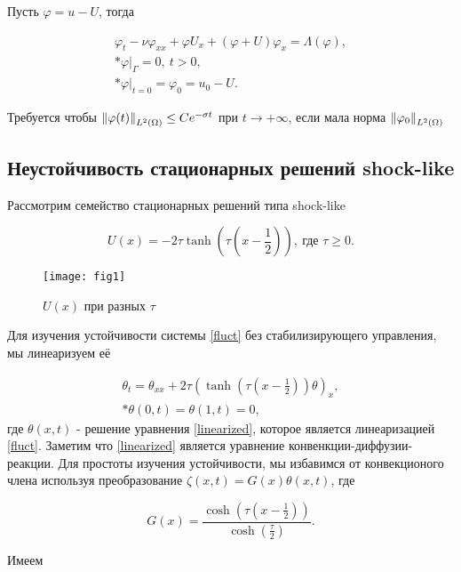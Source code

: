 Пусть $\varphi = u - U$, тогда

\begin{gather}\label{fluct}
    \varphi_t - \nu \varphi_{xx} + \varphi U_x + (\varphi + U)\varphi_x =
    \Lambda(\varphi),\\* 
    \varphi|_{\Gamma} = 0, \ t > 0,\\*
    \varphi|_{t = 0} = \varphi_0 = u_0 - U.
\end{gather}

Требуется чтобы $\left\lVert\varphi(t)\right\rVert_{L^2(\Omega)} \le C e^{-\sigma t}$ при $t \to
+\infty$, если мала норма $\left\lVert\varphi_0\right\rVert_{L^2(\Omega)}$

\subsection{Неустойчивость стационарных решений shock-like}
\vspace{1em}

Рассмотрим семейство стационарных решений типа shock-like

\begin{equation}\label{shock_like}
    U(x) = -2\tau\tanh{(\tau(x - \frac{1}{2}))}, \ \text{где } \tau \ge 0.
\end{equation}

\begin{figure}[H]
    \centering
    \texttt{[image: fig1]}
    \caption{$U(x)$ при разных $\tau$}
\end{figure}

Для изучения устойчивости системы \eqref{fluct} без стабилизирующего управления, 
мы линеаризуем её

\begin{gather}\label{linearized}
    \theta_t = \theta_{xx} + 2 \tau (\tanh(\tau(x - \frac{1}{2}))\theta)_x, \\*
    \theta(0, t) = \theta(1, t) = 0,
\end{gather}
где $\theta(x, t)$ - решение уравнения \eqref{linearized}, которое является
линеаризацией \eqref{fluct}. Заметим что \eqref{linearized} является  уравнение 
конвенкции-диффузии-реакции. Для простоты изучения устойчивости, мы избавимся 
от конвекционого члена используя преобразование 
$\zeta(x, t) = G(x)\theta(x, t)$, где 

\begin{equation}
    G(x) = \frac{\cosh(\tau(x - \frac{1}{2}))}{\cosh(\frac{\tau}{2})}.
\end{equation} 

Имеем 

